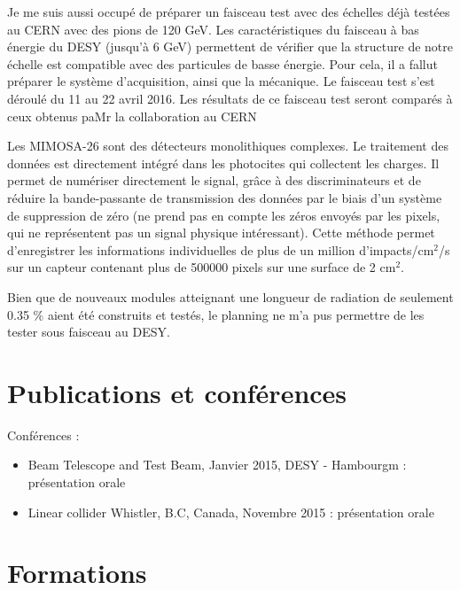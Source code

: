 \documentclass[a4papper, 10pt]{article}
\begin{document}
  Je me suis aussi occupé de préparer un faisceau test avec des échelles déjà testées au CERN avec des pions de 120 GeV. 
  Les caractéristiques du faisceau à bas énergie du DESY (jusqu'à 6 GeV) permettent de vérifier que la structure de notre échelle est compatible avec des particules de basse énergie.
  Pour cela, il a fallut préparer le système d'acquisition, ainsi que la mécanique.
  Le faisceau test s'est déroulé du 11 au 22 avril 2016.
  Les résultats de ce faisceau test seront comparés à ceux obtenus paMr la collaboration au CERN



  Les MIMOSA-26 sont des détecteurs monolithiques complexes. Le traitement des données est directement intégré dans les photocites qui collectent les charges. 
  Il permet de numériser directement le signal, grâce à des discriminateurs et de réduire la bande-passante de transmission des données par le biais d'un système de suppression de zéro (ne prend pas en compte les zéros envoyés par les pixels, qui ne représentent pas un signal physique intéressant).
  Cette méthode permet d'enregistrer les informations individuelles de plus de un million d'impacts/cm$^2$/s sur un capteur contenant plus de 500000 pixels sur une surface de 2 cm$^2$.

  Bien que de nouveaux modules atteignant une longueur de radiation de seulement 0.35 $\%$ aient été construits et testés, le planning ne m'a pus permettre de les tester sous faisceau au DESY. 
  

  \section{Publications et conférences}

  Conférences :
  \begin{itemize}
    \item Beam Telescope and Test Beam, Janvier 2015, DESY - Hambourgm : présentation orale
    \item Linear collider Whistler, B.C, Canada, Novembre 2015 : présentation orale 

  \end{itemize}

  \section{Formations}
 
\end{document}
